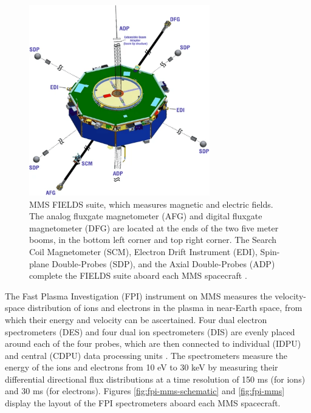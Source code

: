 \begin{figure}
    \centering
    \includegraphics[width=0.7\textwidth]{Figures/Instrumentation/Torbert_Figure7.png}
    \caption[MMS FIELDS suite]{MMS FIELDS suite, which measures magnetic and electric fields. The analog fluxgate magnetometer (AFG) and digital fluxgate magnetometer (DFG) are located at the ends of the two five meter booms, in the bottom left corner and top right corner. The Search Coil Magnetometer (SCM),  Electron Drift Instrument (EDI), Spin-plane Double-Probes (SDP), and the Axial Double-Probes (ADP) complete the FIELDS suite aboard each MMS spacecraft \citep{Burch:2024}.}
    \label{fig:fgm-mms}
\end{figure}

The Fast Plasma Investigation (FPI) \citep{Pollock:2016} instrument on MMS measures the velocity-space distribution of ions and electrons in the plasma in near-Earth space, from which their energy and velocity can be ascertained. Four dual electron spectrometers (DES) and four dual ion spectrometers (DIS) are evenly placed around each of the four probes, which are then connected to individual (IDPU) and central (CDPU) data processing units \citep{Pollock:2016}. The spectrometers measure the energy of the ions and electrons from 10 eV to 30 keV by measuring their differential directional flux distributions at a time resolution of 150 ms (for ions) and 30 ms (for electrons). Figures \ref{fig:fpi-mms-schematic} and \ref{fig:fpi-mms} display the layout of the FPI spectrometers aboard each MMS spacecraft.

